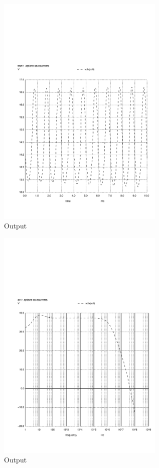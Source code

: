 %

\begin{figure}[H] 
\centering
\includegraphics[width = 8cm]{vo1.pdf} 
\caption{Output}
\label{vo1}
\end{figure}

\begin{figure}[H] 
\centering
\includegraphics[width = 8cm]{vo1f.pdf} 
\caption{Output}
\label{vo1f}
\end{figure}

